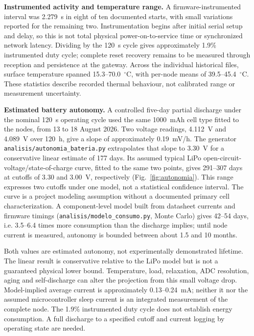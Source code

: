 \documentclass[11pt, letterpaper]{article}
\begin{document}
\textbf{Instrumented activity and temperature range.} A firmware-instrumented interval was 2.279~s in eight of ten documented starts, with small variations reported for the remaining two. Instrumentation begins after initial serial setup and delay, so this is not total physical power-on-to-service time or synchronized network latency. Dividing by the 120~s cycle gives approximately 1.9\% instrumented duty cycle; complete reset recovery remains to be measured through reception and persistence at the gateway. Across the individual historical files, surface temperature spanned 15.3--70.0~$^{\circ}$C, with per-node means of 39.5--45.4~$^{\circ}$C. These statistics describe recorded thermal behaviour, not calibrated range or measurement uncertainty.

\textbf{Estimated battery autonomy.} A controlled five-day partial discharge under the nominal 120~s operating cycle used the same 1000~mAh cell type fitted to the nodes, from 13 to 18 August 2026. Two voltage readings, 4.112~V and 4.089~V over 120~h, give a slope of approximately 0.19~mV/h. The generator \texttt{analisis/autonomia\_bateria.py} extrapolates that slope to 3.30~V for a conservative linear estimate of 177 days. Its assumed typical LiPo open-circuit-voltage/state-of-charge curve, fitted to the same two points, gives 291--307 days at cutoffs of 3.30 and 3.00~V, respectively (Fig.~\ref{fig:autonomia}). This range expresses two cutoffs under one model, not a statistical confidence interval. The curve is a project modeling assumption without a documented primary cell characterization. A component-level model built from datasheet currents and firmware timings (\texttt{analisis/modelo\_consumo.py}, Monte Carlo) gives 42--54 days, i.e. 3.5--6.4 times more consumption than the discharge implies; until node current is measured, autonomy is bounded between about 1.5 and 10 months.

Both values are estimated autonomy, not experimentally demonstrated lifetime. The linear result is conservative relative to the LiPo model but is not a guaranteed physical lower bound. Temperature, load, relaxation, ADC resolution, aging and self-discharge can alter the projection from this small voltage drop. Model-implied average current is approximately 0.13--0.24~mA; neither it nor the assumed microcontroller sleep current is an integrated measurement of the complete node. The 1.9\% instrumented duty cycle does not establish energy consumption. A full discharge to a specified cutoff and current logging by operating state are needed.
\end{document}
